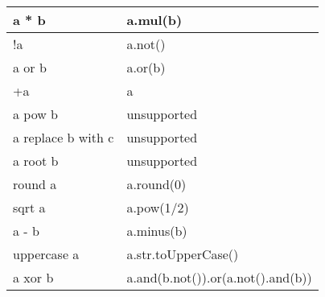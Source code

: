 \begin{table}
\begin{tabular}{|l|l|}
		\hline
		a * b              & a.mul(b)                           \\
		\hline
		!a                 & a.not()                            \\
		\hline
		a or b             & a.or(b)                            \\
		\hline
		+a                 & a                                  \\
		\hline
		a pow b            & unsupported                        \\
		\hline
		a replace b with c & unsupported                        \\
		\hline
		a root b           & unsupported                        \\
		\hline
		round a            & a.round(0)                         \\
		\hline
		sqrt a             & a.pow(1/2)                         \\
		\hline
		a - b              & a.minus(b)                         \\
		\hline
		uppercase a        & a.str.toUpperCase()                \\
		\hline
		a xor b            & a.and(b.not()).or(a.not().and(b))  \\
		\hline
	\end{tabular}
\end{table}


